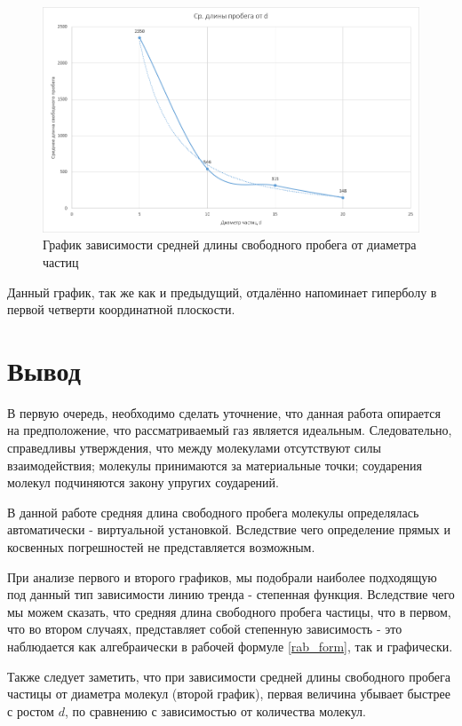 \documentclass[a4paper,12pt]{article}
\begin{document}
\begin{figure}[h!]
	\begin{center}
		\includegraphics[scale=0.4]{3}
	\end{center}
	\caption{График зависимости средней длины свободного пробега от диаметра частиц}
\end{figure}

Данный график, так же как и предыдущий, отдалённо напоминает гиперболу в первой четверти координатной плоскости.

\newpage
\section{Вывод}
\hspace{\parindent}В первую очередь, необходимо сделать уточнение, что данная работа опирается на предположение, что рассматриваемый газ является идеальным. Следовательно, справедливы утверждения, что между молекулами отсутствуют силы взаимодействия; молекулы принимаются за материальные точки; соударения молекул подчиняются закону упругих соударений.

В данной работе средняя длина свободного пробега молекулы определялась автоматически - виртуальной установкой. Вследствие чего определение прямых и косвенных погрешностей не представляется возможным.

При анализе первого и второго графиков, мы подобрали наиболее подходящую под данный тип зависимости линию тренда - степенная функция. Вследствие чего мы можем сказать, что средняя длина свободного пробега частицы, что в первом, что во втором случаях, представляет собой степенную зависимость - это наблюдается как алгебраически в рабочей формуле \eqref{rab_form}, так и графически.

Также следует заметить, что при зависимости средней длины свободного пробега частицы от диаметра молекул (второй график), первая величина убывает быстрее с ростом $d$, по сравнению с зависимостью от количества молекул.
\end{document}
